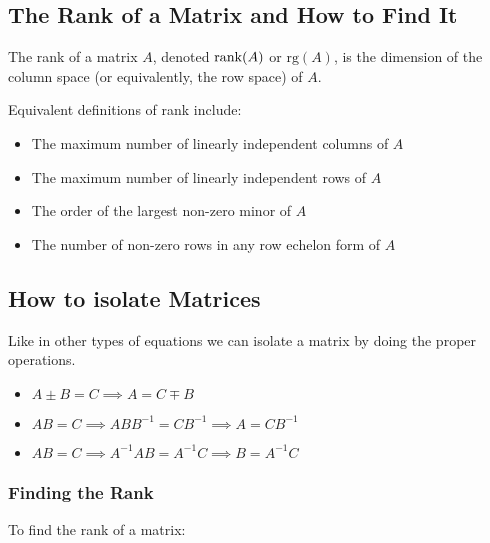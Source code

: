 \subsection{The Rank of a Matrix and How to Find It}

The rank of a matrix \(A\), denoted \(\text{rank}(A)\) or \(\text{rg}(A)\), is the dimension of the column space (or equivalently, the row space) of \(A\).

Equivalent definitions of rank include:

\begin{itemize}
    
    \item The maximum number of linearly independent columns of \(A\)
    
    \item The maximum number of linearly independent rows of \(A\)
    
    \item The order of the largest non-zero minor of \(A\)
    
    \item The number of non-zero rows in any row echelon form of \(A\)

\end{itemize}

\subsection{How to isolate Matrices}

Like in other types of equations we can isolate a matrix by doing the proper operations.

\begin{itemize}

    \item \(A \pm B = C \implies A = C \mp B\) 

    \item \(AB = C \implies ABB^{-1} = CB^{-1}  \implies A = CB^{-1}\)

    \item \(AB = C \implies A^{-1}AB = A^{-1}C  \implies B = A^{-1}C\)

\end{itemize}

\subsubsection{Finding the Rank}

To find the rank of a matrix:

